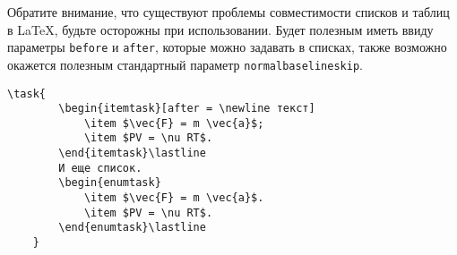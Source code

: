 \noindent
{}

\vspace{0.3cm}

Обратите внимание, что существуют проблемы совместимости списков и таблиц в \LaTeX, будьте осторожны при
использовании. Будет полезным иметь ввиду параметры \texttt{before} и \texttt{after}, которые можно
задавать в списках, также возможно окажется полезным стандартный параметр \texttt{normalbaselineskip}.

\begin{lstlisting}[gobble = 3]
    \task{
        \begin{itemtask}[after = \newline текст]
            \item $\vec{F} = m \vec{a}$;
            \item $PV = \nu RT$.
        \end{itemtask}\lastline
        И еще список.
        \begin{enumtask}
            \item $\vec{F} = m \vec{a}$.
            \item $PV = \nu RT$.
        \end{enumtask}\lastline
    }
\end{lstlisting}

\noindent
{}

